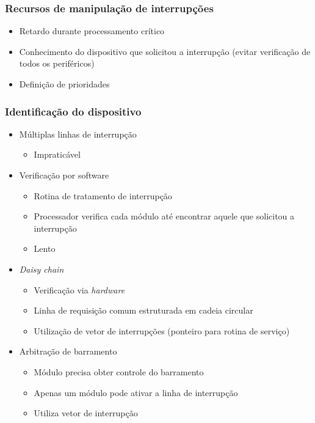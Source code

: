 \documentclass[aspectratio=169,
				xcolor=table]{beamer}
\begin{document}
	\begin{frame}
		\frametitle{Recursos de manipulação de interrupções}
		\begin{itemize}
			\item Retardo durante processamento crítico
			\vspace{1em}
			\item Conhecimento do dispositivo que solicitou a interrupção (evitar verificação de todos os periféricos)
			\vspace{1em}
			\item Definição de prioridades
		\end{itemize}
	\end{frame}
	
	\begin{frame}[allowframebreaks]
		\frametitle{Identificação do dispositivo}
		\begin{itemize}
			\item Múltiplas linhas de interrupção
			\begin{itemize}
				\item Impraticável
			\end{itemize}
			\vspace{1em}
			\item Verificação por software
			\begin{itemize}
				\item Rotina de tratamento de interrupção 
				\item Processador verifica cada módulo até encontrar aquele que solicitou a interrupção
				\item Lento
			\end{itemize}
			\framebreak
			\item \textit{Daisy chain}
			\begin{itemize}
				\item Verificação via \textit{hardware}
				\item Linha de requisição comum estruturada em cadeia circular
				\item Utilização de vetor de interrupções (ponteiro para rotina de serviço)				
			\end{itemize}
			\vspace{1em}
			\item Arbitração de barramento 
			\begin{itemize}
				\item Módulo precisa obter controle do barramento
				\item Apenas um módulo pode ativar a linha de interrupção
				\item Utiliza vetor de interrupção
			\end{itemize}
		\end{itemize}
	\end{frame}
	
\end{document}
